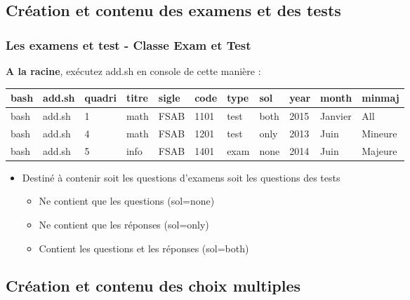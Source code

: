 \documentclass{beamer}
\begin{document}
\subsection{Création et contenu des examens et des tests}

\begin{frame}
    \frametitle{Les examens et test - Classe Exam et Test}
    \begin{exampleblock}{\textbf{A la racine}, exécutez add.sh en
    console de cette manière :}
       \tiny \begin{tabular}{lllllllllll}
           bash & add.sh & quadri & titre & sigle & code & type & sol &
           year & month & minmaj \\
           \hline
           bash & add.sh & 1 & math & FSAB & 1101 & test & both & 2015 &
           Janvier & All \\
           bash & add.sh & 4 & math & FSAB & 1201 & test & only & 2013 &
           Juin & Mineure \\
           bash & add.sh & 5 & info & FSAB & 1401 & exam & none & 2014 &
           Juin & Majeure \\
       \end{tabular}
    \end{exampleblock}
    \begin{itemize}
        \item Destiné à contenir soit les questions d'examens soit les
            questions des tests
            \begin{itemize}
                 \item Ne contient que les questions (sol=none)
                 \item Ne contient que les réponses (sol=only)
                 \item Contient les questions et les réponses (sol=both)
             \end{itemize}
    \end{itemize}
\end{frame}

\subsection{Création et contenu des choix multiples}
\end{document}
